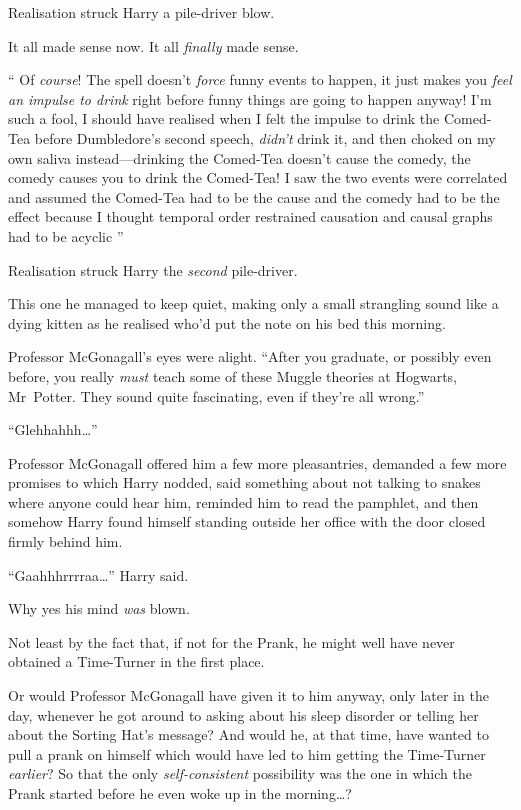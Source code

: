 Realisation struck Harry a pile-driver blow.

It all made sense now. It all \emph{finally} made sense.

“ Of \emph{course}! The spell doesn’t \emph{force} funny events to happen, it just makes you \emph{feel an impulse to drink} right before funny things are going to happen anyway! I’m such a fool, I should have realised when I felt the impulse to drink the Comed-Tea before Dumbledore’s second speech, \emph{didn’t} drink it, and then choked on my own saliva instead—drinking the Comed-Tea doesn’t cause the comedy, the comedy causes you to drink the Comed-Tea! I saw the two events were correlated and assumed the Comed-Tea had to be the cause and the comedy had to be the effect because I thought temporal order restrained causation and causal graphs had to be acyclic ”

Realisation struck Harry the \emph{second} pile-driver.

This one he managed to keep quiet, making only a small strangling sound like a dying kitten as he realised who’d put the note on his bed this morning.

Professor McGonagall’s eyes were alight. “After you graduate, or possibly even before, you really \emph{must} teach some of these Muggle theories at Hogwarts, Mr~Potter. They sound quite fascinating, even if they’re all wrong.”

“Glehhahhh…”

Professor McGonagall offered him a few more pleasantries, demanded a few more promises to which Harry nodded, said something about not talking to snakes where anyone could hear him, reminded him to read the pamphlet, and then somehow Harry found himself standing outside her office with the door closed firmly behind him.

“Gaahhhrrrraa…” Harry said.

Why yes his mind \emph{was} blown.

Not least by the fact that, if not for the Prank, he might well have never obtained a Time-Turner in the first place.

Or would Professor McGonagall have given it to him anyway, only later in the day, whenever he got around to asking about his sleep disorder or telling her about the Sorting Hat’s message? And would he, at that time, have wanted to pull a prank on himself which would have led to him getting the Time-Turner \emph{earlier}? So that the only \emph{self-consistent} possibility was the one in which the Prank started before he even woke up in the morning…?


